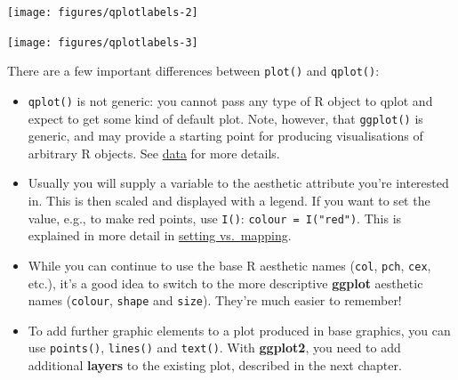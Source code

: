 \begin{flushleft}\texttt{[image: figures/qplotlabels-2]} \end{flushleft}

\begin{Shaded}
\begin{Highlighting}[]
\NormalTok{>}\StringTok{ }  \NormalTok{)}
\end{Highlighting}
\end{Shaded}

\begin{flushleft}\texttt{[image: figures/qplotlabels-3]} \end{flushleft}


There are a few important differences between \texttt{plot()} and
\texttt{qplot()}:

\begin{itemize}
\item
  \texttt{qplot()} is not generic: you cannot pass any type of R object
  to qplot and expect to get some kind of default plot. Note, however,
  that \texttt{ggplot()} is generic, and may provide a starting point
  for producing visualisations of arbitrary R objects. See
  \hyperref[cha:data]{data} for more details.
\item
  Usually you will supply a variable to the aesthetic attribute you're
  interested in. This is then scaled and displayed with a legend. If you
  want to set the value, e.g., to make red points, use \texttt{I()}:
  \texttt{colour = I("red")}. This is explained in more detail in
  \hyperref[sub:setting-mapping]{setting vs.~mapping}.
\item
  While you can continue to use the base R aesthetic names
  (\texttt{col}, \texttt{pch}, \texttt{cex}, etc.), it's a good idea to
  switch to the more descriptive \textbf{ggplot} aesthetic names
  (\texttt{colour}, \texttt{shape} and \texttt{size}). They're much
  easier to remember!
\item
  To add further graphic elements to a plot produced in base graphics,
  you can use \texttt{points()}, \texttt{lines()} and \texttt{text()}.
  With \textbf{ggplot2}, you need to add additional \textbf{layers} to
  the existing plot, described in the next chapter.
\end{itemize}
